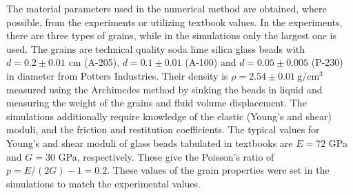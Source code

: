 \documentclass[twoside,twocolumn,9pt]{article}
\begin{document}
The material parameters used in the numerical method are obtained, where possible, from the experiments or utilizing textbook values.
In the experiments, there are three types of grains, while in the simulations only the largest one is used. The grains are technical quality soda lime silica glass beads with $d=0.2\pm0.01$ cm (A-205),  $d=0.1\pm0.01$ (A-100) and $d=0.05\pm0.005$ (P-230) in diameter from Potters Industries. Their density is $\rho=2.54 \pm 0.01~\mathrm{g/cm^3}$ measured using the Archimedes method by sinking the beads in liquid and measuring the weight of the grains and fluid volume displacement.
The simulations additionally require knowledge of the elastic (Young's and shear) moduli, and the friction and restitution coefficients.
The typical values for Young's and shear moduli of glass beads tabulated in textbooks are $E=72$ GPa and $G=30$ GPa, respectively.
These give the Poisson's ratio of $p = E/(2G) - 1 = 0.2$.
These values of the grain properties were set in the simulations to match the experimental values.
\end{document}
